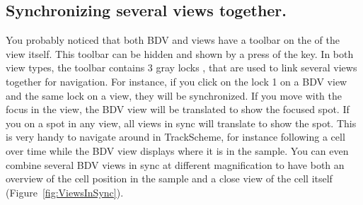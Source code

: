 \subsection{Synchronizing several views together.}
\label{sec:LinkingViews}

You probably noticed that both BDV and \TrackScheme views have a toolbar on the of the view itself.
This toolbar can be hidden and shown by a press of the  key.
In both view types, the toolbar contains 3 gray locks , that are used to link several views together for navigation.
For instance, if you click on the lock 1  on a BDV view and the same lock on a \TrackScheme view, they will be synchronized.
If you move with the focus in the \TrackScheme view, the BDV view will be translated to show the focused spot.
If you  on a spot in any view, all views in sync will translate to show the spot.
This is very handy to navigate around in TrackScheme, for instance following a cell over time while the BDV view displays where it is in the sample. 
You can even combine several BDV views in sync at different magnification to have both an overview of the cell position in the sample and a close view of the cell itself (Figure~\ref{fig:ViewsInSync}).


